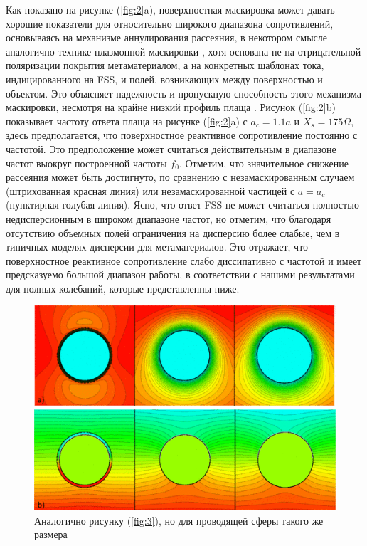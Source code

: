 \documentclass[12pt,a4paper]{article}
\begin{document}
Как показано на рисунке (\ref{fig:2}a), поверхностная маскировка может давать хорошие 
показатели для относительно широкого диапазона сопротивлений, основываясь на механизме
аннулирования рассеяния, в некотором смысле аналогично технике плазмонной маскировки 
\cite{8}, хотя основана не на отрицательной поляризации покрытия метаматериалом, а на
конкретных шаблонах тока, индицированного на FSS, и полей, возникающих между поверхностью и
объектом. Это объясняет надежность и пропускную способность этого механизма маскировки,
несмотря на крайне низкий профиль плаща \cite{13}. Рисунок (\ref{fig:2}b) показывает
частоту ответа плаща на рисунке (\ref{fig:2}a) с $a_c=1.1a$ и $X_s = 175\Omega$, здесь 
предполагается, что поверхностное реактивное сопротивление постоянно с частотой. Это 
предположение может считаться действительным в диапазоне частот выокруг построенной
частоты $f_0$. Отметим, что значительное снижение рассеяния может быть достигнуто, по 
сравнению с незамаскированным случаем (штрихованная красная линия) или незамаскированной
частицей с $a=a_c$ (пунктирная голубая линия). Ясно, что ответ FSS не может считаться 
полностью недисперсионным в широком диапазоне частот, но отметим, что благодаря отсутствию
объемных полей ограничения на дисперсию более слабые, чем в типичных моделях дисперсии для 
метаматериалов. Это отражает, что поверхностное реактивное сопротивление слабо диссипативно
с частотой и имеет предсказуемо большой диапазон работы, в соответствии с нашими результатами
для полных колебаний, которые представленны ниже.

\begin{figure}[t]
  \centering
  \includegraphics[height=0.15\paperheight, width=0.4\paperwidth]{5.png}
  \caption{Аналогично рисунку (\ref{fig:3}), но для проводящей сферы такого же размера}
  \label{fig:5}
\end{figure}
\end{document}
